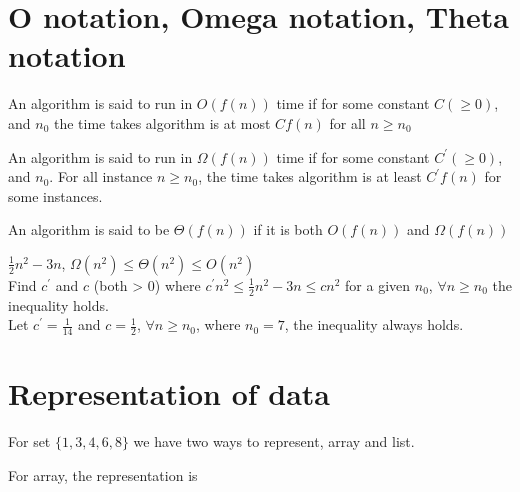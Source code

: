 		\section{O notation, Omega notation, Theta notation}
			\begin{definition}[O notation]
				An algorithm is said to run in $O(f(n))$ time if for some constant $C (\ge 0)$, and $n_0$ the time takes algorithm is at most $Cf(n)$ for all $n\ge n_0$ 
			\end{definition}

			\begin{definition}
				An algorithm is said to run in $\Omega(f(n))$ time if for some constant $C^{'} (\ge 0)$, and $n_0$. For all instance $n \ge n_0$, the time takes algorithm is at least $C^{'}f(n)$ for some instances. 
			\end{definition}

			\begin{definition}
				An algorithm is said to be $\Theta(f(n))$ if it is both $O(f(n))$ and $\Omega(f(n))$
			\end{definition}

			\begin{example}
				$\frac{1}{2}n^2 - 3n$, $\Omega(n^2) \le \Theta(n^2) \le O(n^2)$\\
				Find $c^{'}$ and $c$ (both > 0) where $c^{'}n^2 \le \frac{1}{2}n^2 - 3n \le cn^2$ for a given $n_0$, $\forall n\ge n_0$ the inequality holds.\\
				Let $c^{'} = \frac{1}{14}$ and $c = \frac{1}{2}$, $\forall n \ge n_0$, where $n_0 = 7$, the inequality always holds.
			\end{example}

		\section{Representation of data}
			For set $\{1, 3, 4, 6, 8\}$ we have two ways to represent, array and list.

			For array, the representation is
			\begin{figure}[!ht]
				\centering
			\end{figure}


